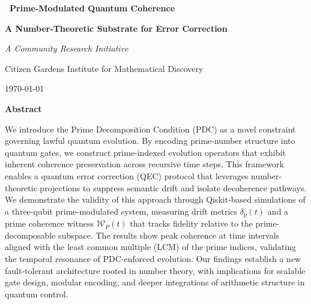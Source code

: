 \documentclass[12]{amsart}
\theoremstyle{plain}
\begin{document}
\begin{titlepage}
    \centering
    \vspace*{3cm}

    {\Huge\bfseries\ Prime-Modulated Quantum Coherence
 \par}
    \vspace{0.5cm}
    {\LARGE\bfseries A Number-Theoretic Substrate for Error Correction\par}

    \vspace{2cm}
    {\Large\itshape A Community Research Initiative \par}
    \vspace{0.5cm}
    {\normalsize Citizen Gardens Institute for Mathematical Discovery \par}
    {\normalsize \today \par}

    \vfill

    {\bfseries Abstract \par}
    \vspace{0.5em}
    \begin{minipage}{0.85\textwidth}
        \small
We introduce the Prime Decomposition Condition (PDC) as a novel constraint governing lawful quantum evolution. By encoding prime-number structure into quantum gates, we construct prime-indexed evolution operators that exhibit inherent coherence preservation across recursive time steps. This framework enables a quantum error correction (QEC) protocol that leverages number-theoretic projections to suppress semantic drift and isolate decoherence pathways. We demonstrate the validity of this approach through Qiskit-based simulations of a three-qubit prime-modulated system, measuring drift metrics $\delta_p(t)$ and a prime coherence witness $\mathcal{W}_P(t)$ that tracks fidelity relative to the prime-decomposable subspace. The results show peak coherence at time intervals aligned with the least common multiple (LCM) of the prime indices, validating the temporal resonance of PDC-enforced evolution. Our findings establish a new fault-tolerant architecture rooted in number theory, with implications for scalable gate design, modular encoding, and deeper integrations of arithmetic structure in quantum control.

    \end{minipage}

\end{titlepage}


\clearpage
\end{document}
